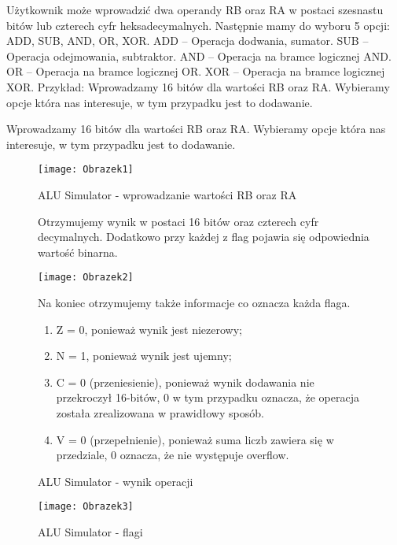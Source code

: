 \documentclass[12pt, a4paper, onside, polish]{article}				%
\begin{document}
Użytkownik może wprowadzić dwa operandy RB oraz RA w postaci szesnastu bitów lub czterech cyfr heksadecymalnych. Następnie mamy do wyboru 5 opcji: ADD, SUB, AND, OR, XOR.\newline\newline
ADD – Operacja dodwania, sumator.\newline
SUB – Operacja odejmowania, subtraktor.\newline
AND – Operacja na bramce logicznej AND.\newline
OR – Operacja na bramce logicznej OR.\newline
XOR – Operacja na bramce logicznej XOR. \newline\newline
\setlength{\parindent}{0cm}
Przykład:  \newline
Wprowadzamy 16 bitów dla wartości RB oraz RA. Wybieramy opcje która nas interesuje, w tym przypadku jest to dodawanie.
\begin{enumerate}
\item Wprowadzamy 16 bitów dla wartości RB oraz RA. Wybieramy opcje która nas interesuje, w tym przypadku jest to dodawanie.
 \begin{figure}[H]
{\centering \texttt{[image: Obrazek1]} \caption{ALU Simulator - wprowadzanie wartości RB oraz RA}}\vspace{5mm}
\item Otrzymujemy wynik w postaci 16 bitów oraz czterech cyfr decymalnych. Dodatkowo przy każdej z flag pojawia się odpowiednia wartość binarna. 
{\centering \texttt{[image: Obrazek2]} \caption{ALU Simulator - wynik operacji}}\vspace{5mm}
\item Na koniec otrzymujemy także informacje co oznacza każda flaga.
 \begin{enumerate}
    \item Z = 0, ponieważ wynik jest niezerowy;
    \item N = 1, ponieważ wynik jest ujemny;
    \item C = 0 (przeniesienie), ponieważ wynik dodawania nie przekroczył 16-bitów, 0 w tym przypadku oznacza, że operacja została zrealizowana w prawidłowy sposób.
    \item V = 0 (przepełnienie), ponieważ suma liczb zawiera się w przedziale, 0 oznacza, że nie występuje overflow.
\end{enumerate}
\end{figure}
 \begin{figure}[H]
{\centering \texttt{[image: Obrazek3]} \caption{ALU Simulator - flagi}}\vspace{5mm}
\end{figure}
\end{enumerate}
\end{document}
